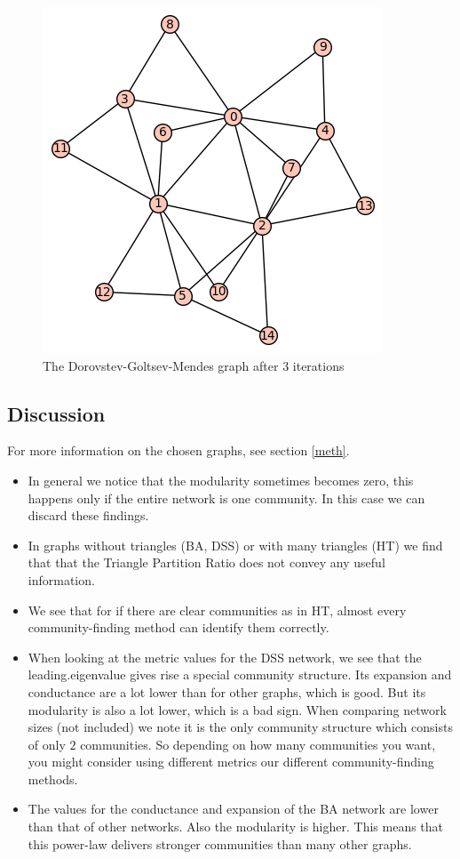 \documentclass[paper=a4, fontsize=11pt]{scrartcl} %
\begin{document}
\begin{figure}[htbp]
   \centering
   \includegraphics{dgm} %
   \caption{The Dorovstev-Goltsev-Mendes graph after $3$ iterations}
   \label{dgm}
\end{figure}

\newpage

\subsection{Discussion}
For more information on the chosen graphs, see section \ref{meth}. 
\begin{itemize}
\item In general we notice that the modularity sometimes becomes zero, this happens only if the entire network is one community. In this case we can discard these findings.
\item In graphs without triangles (BA, DSS) or with many triangles (HT) we find that that the Triangle Partition Ratio does not convey any useful information.
\item We see that for if there are clear communities as in HT, almost every community-finding method can identify them correctly.
\item When looking at the metric values for the DSS network, we see that the leading.eigenvalue gives rise a special community structure. Its expansion and conductance are a lot lower than for other graphs, which is good. But its modularity is also a lot lower, which is a bad sign. When comparing network sizes (not included) we note it is the only community structure which consists of only $2$ communities. So depending on how many communities you want, you might consider using different metrics our different community-finding methods.
\item The values for the conductance and expansion of the BA network are lower than that of other networks. Also the modularity is higher. This means that this power-law delivers stronger communities than many other graphs.
\end{itemize}
\end{document}
